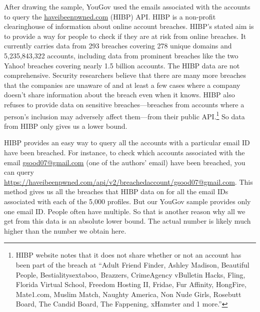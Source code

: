 \documentclass[12pt, letterpaper]{article}
\begin{document}
After drawing the sample, YouGov used the emails associated with the accounts to query the \url{haveibeenpwned.com} (HIBP) API. HIBP is a non-profit clearinghouse of information about online account breaches. HIBP's stated aim is to provide a way for people to check if they are at risk from online breaches. It currently carries data from 293 breaches covering 278 unique domains and 5,235,843,322 accounts, including data from prominent breaches like the two Yahoo! breaches covering nearly 1.5 billion accounts. The HIBP data are not comprehensive. Security researchers believe that there are many more breaches that the companies are unaware of and at least a few cases where a company doesn't share information about the breach even when it knows. HIBP also refuses to provide data on sensitive breaches---breaches from accounts where a person's inclusion may adversely affect them---from their public API.\footnote{HIBP website notes that it does not share whether or not an account has been part of the breach at ``Adult Friend Finder, Ashley Madison, Beautiful People, Bestialitysextaboo, Brazzers, CrimeAgency vBulletin Hacks, Fling, Florida Virtual School, Freedom Hosting II, Fridae, Fur Affinity, HongFire, Mate1.com, Muslim Match, Naughty America, Non Nude Girls, Rosebutt Board, The Candid Board, The Fappening, xHamster and 1 more.''} So data from HIBP only gives us a lower bound.

HIBP provides an easy way to query all the accounts with a particular email ID have been breached. For instance, to check which accounts associated with the email \url{gsood07@gmail.com} (one of the authors' email) have been breached, you can query \url{https://haveibeenpwned.com/api/v2/breachedaccount/gsood07@gmail.com}. This method gives us all the breaches that HIBP data on for all the email IDs associated with each of the 5,000 profiles. But our YouGov sample provides only one email ID. People often have multiple. So that is another reason why all we get from this data is an absolute lower bound. The actual number is likely much higher than the number we obtain here.
\end{document}

